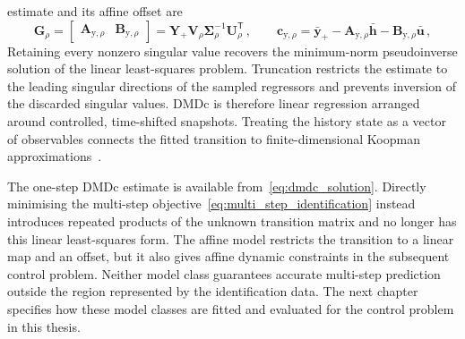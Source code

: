 estimate and its affine offset are
%
\begin{equation}
    \mathbf{G}_\rho
    = \begin{bmatrix}\mathbf{A}_{\mathrm{y},\rho} & \mathbf{B}_{\mathrm{y},\rho}\end{bmatrix}
    = \mathbf{Y}_+\mathbf{V}_\rho\boldsymbol{\Sigma}_\rho^{-1}\mathbf{U}_\rho^\mathsf{T} \,,
    \qquad
    \mathbf{c}_{\mathrm{y},\rho}
    = \bar{\mathbf{y}}_+
    - \mathbf{A}_{\mathrm{y},\rho}\bar{\mathbf{h}}
    - \mathbf{B}_{\mathrm{y},\rho}\bar{\mathbf{u}} \,,
    \label{eq:dmdc_solution}
\end{equation}
%
Retaining every nonzero singular value recovers the minimum-norm pseudoinverse solution of
the linear least-squares problem.
Truncation restricts the estimate to the leading singular directions
of the sampled regressors and prevents inversion of the discarded singular values. DMDc is
therefore linear regression arranged around controlled, time-shifted snapshots. Treating the
history state as a vector of observables connects the fitted transition to finite-dimensional  %
Koopman approximations~\cite{Williams2015,Proctor2016}. %

The one-step DMDc estimate is available from~\eqref{eq:dmdc_solution}. Directly minimising the
multi-step objective~\eqref{eq:multi_step_identification} instead introduces repeated products
of the unknown transition matrix and no longer has this linear least-squares form. The affine
model restricts the transition to a linear map and an offset, but it also gives affine dynamic
constraints in the subsequent control problem. Neither model class guarantees accurate
multi-step prediction outside the region represented by the identification data. The next
chapter specifies how these model classes are fitted and evaluated for the control problem in
this thesis.
